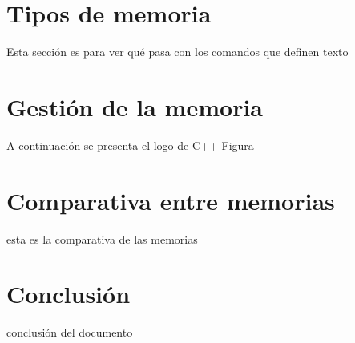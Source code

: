 \documentclass{article}
\begin{document}
\section{Tipos de memoria}

Esta sección es para ver qué pasa con los comandos 
que definen texto

\section{Gestión de la memoria}
A continuación se presenta el logo de C++ Figura 

\section{Comparativa entre memorias}
 esta es la comparativa de las memorias

\section{Conclusión} 
conclusión del documento





\cite{rebollo}
\cite{figura1}
\end{document}

